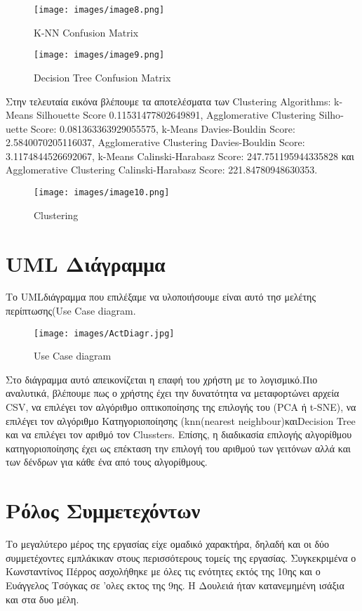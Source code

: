 \documentclass{article}
\begin{document}
\begin{figure}[h]
   \centering
   \texttt{[image: images/image8.png]}
   \caption{\textlatin{K-NN Confusion Matrix}}
   \label{fig:example}
\end{figure}

\begin{figure}[h]
   \centering
   \texttt{[image: images/image9.png]}
   \caption{\textlatin{Decision Tree Confusion Matrix}}
   \label{fig:example}
\end{figure}
\newpage
Στην τελευταία εικόνα βλέπουμε τα αποτελέσματα των \textlatin{Clustering Algorithms}: \textlatin{k-Means Silhouette Score 0.11531477802649891}, \textlatin{Agglomerative Clustering Silhouette Score:} 0.081363363929055575, \textlatin{k-Means Davies-Bouldin Score}: 2.5840070205116037, \textlatin{Agglomerative Clustering Davies-Bouldin Score}: 3.1174844526692067, \textlatin{k-Means Calinski-Harabasz Score}: 247.751195944335828 και \textlatin{Agglomerative Clustering Calinski-Harabasz Score}: 221.84780948630353.
\newpage\begin{figure}[h]
   \centering
   \texttt{[image: images/image10.png]}
   \caption{\textlatin{Clustering}}
   \label{fig:example}
\end{figure}

\newpage\section{\textlatin{UML} Διάγραμμα}
Το \textlatin{UML}διάγραμμα που επιλέξαμε να υλοποιήσουμε είναι αυτό τησ μελέτης περίπτωσης(\textlatin{Use Case diagram}.
\begin{figure}[h]
   \centering
   \texttt{[image: images/ActDiagr.jpg]}
   \caption{\textlatin{Use Case diagram}}
   \label{fig:example}
\end{figure}
Στο διάγραμμα αυτό απεικονίζεται η επαφή του χρήστη με το λογισμικό.Πιο αναλυτικά, βλέπουμε πως ο χρήστης έχει την δυνατότητα να μεταφορτώνει αρχεία \textlatin{CSV}, να επιλέγει τον αλγόριθμο οπτικοποίησης της επιλογής του (\textlatin{PCA} ή \textlatin{t-SNE}), να επιλέγει τον αλγόριθμο Κατηγοριοποίησης (\textlatin{knn(nearest neighbour)}και\textlatin{Decision Tree} και να επιλέγει τον αριθμό τον \textlatin{Clussters}. Επίσης, η διαδικασία επιλογής αλγορίθμου κατηγοριοποίησης έχει ως επέκταση την επιλογή του αριθμού των γειτόνων αλλά και των δένδρων για κάθε ένα από τους αλγορίθμους.

\newpage\section{Ρόλος Συμμετεχόντων}
Το μεγαλύτερο μέρος της εργασίας είχε ομαδικό χαρακτήρα, δηλαδή και οι δύο συμμετέχοντες εμπλάκικαν στους περισσότερους τομείς της εργασίας. Συγκεκριμένα ο Κωνσταντίνος Πέρρος ασχολήθηκε με όλες τις ενότητες εκτός της 10ης και ο Ευάγγελος Τσόγκας σε 'ολες εκτος της 9ης. Η Δουλειά ήταν κατανεμημένη ισάξια και στα δυο μέλη.
\end{document}
